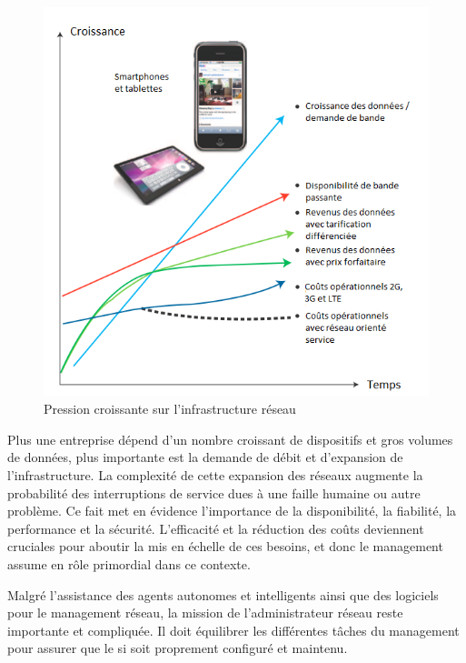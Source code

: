 \begin{figure}[!h] %
\includegraphics[width=15cm]{images/IncreasingPressureOnNetworkInfra2.png} %
\caption{ Pression croissante sur l'infrastructure réseau \cite{IBMManagingGrowingPainsNeed}} %
\label{imgPressure} %
\end{figure} %

Plus une entreprise dépend d'un nombre croissant de dispositifs et gros volumes de données, plus importante est la demande de débit et d'expansion de l'infrastructure. La complexité de cette expansion des réseaux augmente la probabilité des interruptions de service dues à une faille humaine ou autre problème. Ce fait met en évidence l'importance de la disponibilité, la fiabilité, la performance et la sécurité. L'efficacité et la réduction des coûts deviennent cruciales pour aboutir la mis en échelle de ces besoins, et donc le management assume en rôle primordial dans ce contexte. \cite{IBMManagingGrowingPainsNeed}
 

Malgré l'assistance des agents autonomes et intelligents ainsi que des logiciels pour le management réseau, la mission de l'administrateur réseau reste importante et compliquée. Il doit équilibrer les différentes tâches du management pour assurer que le \gls{si} soit proprement configuré et maintenu. \cite{CentralIssuesNetworkManagementConclusion}


